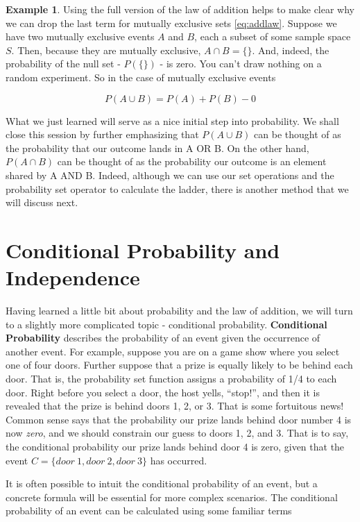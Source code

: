 \documentclass[
]{book}
\theoremstyle{definition}
\theoremstyle{definition}
\newtheorem{example}{Example}[chapter]
\theoremstyle{definition}
\theoremstyle{definition}
\theoremstyle{remark}
\begin{document}
\begin{example}
Using the full version of the law of addition helps to make clear why we can drop the last term for mutually exclusive sets \eqref{eq:addlaw}. Suppose we have two mutually exclusive events \(A\) and \(B\), each a subset of some sample space \(S\). Then, because they are mutually exclusive, \(A \cap B = \{\}\). And, indeed, the probability of the null set - \(P(\{\})\) - is zero. You can't draw nothing on a random experiment. So in the case of mutually exclusive events

\[P(A \cup B) = P(A) + P(B) - 0\]
\end{example}

What we just learned will serve as a nice initial step into probability. We shall close this session by further emphasizing that \(P(A \cup B)\) can be thought of as the probability that our outcome lands in A OR B. On the other hand, \(P(A \cap B)\) can be thought of as the probability our outcome is an element shared by A AND B. Indeed, although we can use our set operations and the probability set operator to calculate the ladder, there is another method that we will discuss next.

\section{Conditional Probability and Independence}\label{conditional-probability-and-independence}

Having learned a little bit about probability and the law of addition, we will turn to a slightly more complicated topic - conditional probability. \textbf{Conditional Probability} describes the probability of an event given the occurrence of another event. For example, suppose you are on a game show where you select one of four doors. Further suppose that a prize is equally likely to be behind each door. That is, the probability set function assigns a probability of 1/4 to each door. Right before you select a door, the host yells, ``stop!'', and then it is revealed that the prize is behind doors 1, 2, or 3. That is some fortuitous news! Common sense says that the probability our prize lands behind door number 4 is now \emph{zero}, and we should constrain our guess to doors 1, 2, and 3. That is to say, the conditional probability our prize lands behind door 4 is zero, given that the event \(C = \{door\:1,door\:2,door\:3\}\) has occurred.

It is often possible to intuit the conditional probability of an event, but a concrete formula will be essential for more complex scenarios. The conditional probability of an event can be calculated using some familiar terms
\end{document}
